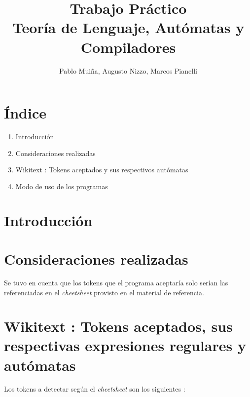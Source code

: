 \documentclass[a4paper,11pt]{article}
\title{Trabajo Pr\'actico \\ Teor\'ia de Lenguaje, Aut\'omatas y Compiladores }
\author{Pablo Mui\~na, Augusto Nizzo, Marcos Pianelli}
\begin{document}
\maketitle

\section{ \'Indice }

\begin{enumerate}
\item Introducci\'on
\item Consideraciones realizadas
\item Wikitext : Tokens aceptados y sus respectivos aut\'omatas
\item Modo de uso de los programas
\end{enumerate}


\section{ Introducci\'on }



\section{ Consideraciones realizadas }

Se tuvo en cuenta que los tokens que el programa aceptar\'ia solo ser\'ian las referenciadas en el \emph{cheetsheet} provisto en el material de referencia.

\section{Wikitext : Tokens aceptados, sus respectivas expresiones regulares y aut\'omatas}

Los tokens a detectar seg\'un el \emph{cheetsheet} son los siguientes :\\
\end{document}
